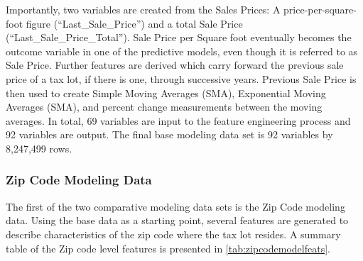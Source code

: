 \documentclass[12pt,]{article}
\begin{document}
Importantly, two variables are created from the Sales Prices: A
price-per-square-foot figure (``Last\_Sale\_Price'') and a total Sale
Price (``Last\_Sale\_Price\_Total''). Sale Price per Square foot
eventually becomes the outcome variable in one of the predictive models,
even though it is referred to as Sale Price. Further features are
derived which carry forward the previous sale price of a tax lot, if
there is one, through successive years. Previous Sale Price is then used
to create Simple Moving Averages (SMA), Exponential Moving Averages
(SMA), and percent change measurements between the moving averages. In
total, 69 variables are input to the feature engineering process and 92
variables are output. The final base modeling data set is 92 variables
by 8,247,499 rows.

\hypertarget{zip-code-modeling-data}{%
\subsubsection{Zip Code Modeling Data}\label{zip-code-modeling-data}}

The first of the two comparative modeling data sets is the Zip Code
modeling data. Using the base data as a starting point, several features
are generated to describe characteristics of the zip code where the tax
lot resides. A summary table of the Zip code level features is presented
in \ref{tab:zipcodemodelfeats}.
\end{document}
